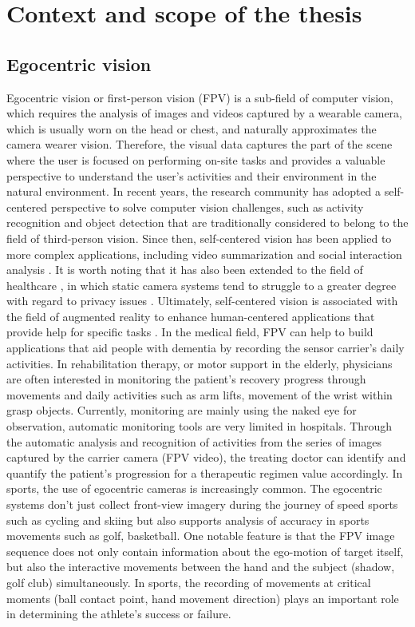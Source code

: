 \section{Context and scope of the thesis}
\subsection{Egocentric vision}
Egocentric vision or first-person vision (FPV) is a sub-field of computer vision, which requires the analysis of images and videos captured by a wearable camera, which is usually worn on the head or chest, and naturally approximates the camera wearer vision. Therefore, the visual data captures the part of the scene where the user is focused on performing on-site tasks and provides a valuable perspective to understand the user's activities and their environment in the natural environment.
In recent years, the research community has adopted a self-centered perspective to solve computer vision challenges, such as activity recognition \cite{10.1109/ICCV.2011.6126269} and object detection \cite{5995444} that are traditionally considered to belong to the field of third-person vision. Since then, self-centered vision has been applied to more complex applications, including video summarization \cite{6247820} and social interaction analysis \cite{7780657}. It is worth noting that it has also been extended to the field of healthcare \cite{wearable}, in which static camera systems tend to struggle to a greater degree with regard to privacy issues \cite{6091176}. Ultimately, self-centered vision is associated with the field of augmented reality to enhance human-centered applications that provide help for specific tasks \cite{10.1145/3041164.3041185}.
In the medical field, FPV can help to build applications that aid people with dementia by recording the sensor carrier's daily activities. In rehabilitation therapy, or motor support in the elderly, physicians are often interested in monitoring the patient's recovery progress through movements and daily activities such as arm lifts, movement of the wrist within grasp objects. Currently, monitoring are mainly using the naked eye for observation, automatic monitoring tools are very limited in hospitals. Through the automatic analysis and recognition of activities from the series of images captured by the carrier camera (FPV video), the treating doctor can identify and quantify the patient's progression for a therapeutic regimen value accordingly.
In sports, the use of egocentric cameras is increasingly common. The egocentric systems don't just collect front-view imagery during the journey of speed sports such as cycling and skiing but also supports analysis of accuracy in sports movements such as golf, basketball. One notable feature is that the FPV image sequence does not only contain information about the ego-motion of target itself, but also the interactive movements between the hand and the subject (shadow, golf club) simultaneously. In sports, the recording of movements at critical moments (ball contact point, hand movement direction) plays an important role in determining the athlete's success or failure.
